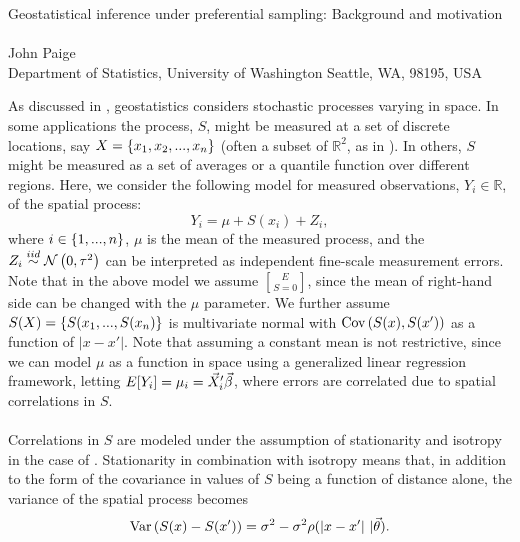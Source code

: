 \documentclass{uwstat572}
\begin{document}

\begin{center}
  {\LARGE Geostatistical inference under preferential sampling: Background and motivation}\\\ \\
  {John Paige \\ 
    Department of Statistics, University of Washington Seattle, WA, 98195, USA
  }
\end{center}

As discussed in \citet{diggle2010}, geostatistics considers stochastic processes varying in space.  In some applications the process, $S$, might be measured at a set of discrete locations, say $X = \left\{x_1, x_2, ..., x_n\right\}$ (often a subset of $\mathbb{R}^2$, as in \citet{diggle2010}).  In others, $S$ might be measured as a set of averages or a quantile function over different regions.  Here, we consider the following model for measured observations, $Y_i \in \mathbb{R}$, of the spatial process:
\begin{equation}
Y_i = \mu + S(x_i) + Z_i,
\label{model}
\end{equation}
where $i \in \left\{1, ..., n\right\}$, $\mu$ is the mean of the measured process, and the $Z_i \stackrel{iid}{\sim} \mathcal{N} \left( 0, \tau^2 \right)$ can be interpreted as independent fine-scale measurement errors.  Note that in the above model we assume $E\brack{S} = 0$, since the mean of right-hand side can be changed with the $\mu$ parameter.  We further assume $S(X) = \left\{S(x_1, ..., S(x_n)\right\}$ is multivariate normal with $\text{Cov}\left(S(x), S(x')\right)$ as a function of $|x - x'|$.  Note that assuming a constant mean is not restrictive, since we can model $\mu$ as a function in space using a generalized linear regression framework, letting $E[Y_i] = \mu_i = \vec{X}_i' \vec{\beta}$, where errors are correlated due to spatial correlations in $S$.
\\\\
Correlations in $S$ are modeled under the assumption of stationarity and isotropy  in the case of \citet{diggle2010}.  Stationarity in combination with isotropy means that, in addition to the form of the covariance in values of $S$ being a function of distance alone, the variance of the spatial process becomes
\begin{equation}
\text{Var}\left(S(x) - S(x')\right) = \sigma^2 - \sigma^2 \rho(|x - x'| \ \vert \vec{\theta}).
\label{variogram}
\end{equation}
\end{document}
